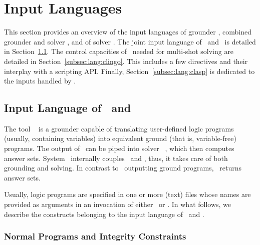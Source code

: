 \section{Input Languages}\label{sec:language}

This section provides an overview of the input languages of
grounder \gringo, combined grounder and solver \clingo, 
and of solver \clasp.
The joint input language of \gringo\ and \clingo\ is detailed in
Section~\ref{subsec:lang:gringo}.
The control capacities of \clingo\ needed for multi-shot solving are detailed in Section~\ref{subsec:lang:clingo}.
This includes a few directives and their interplay with a scripting API.
Finally, Section~\ref{subsec:lang:clasp} is dedicated to the inputs handled by \clasp.

\subsection{Input Language of \gringo\ and \clingo}\label{subsec:lang:gringo}

The tool \gringo~\cite{gescth07a} is a grounder capable of translating
user-defined logic programs (usually, containing variables) into 
equivalent ground (that is, variable-free) programs.
The output of \gringo\ can be piped into solver \clasp~\cite{gekanesc07a,gekasc09c},
which then computes answer sets.
System \clingo\ internally couples \gringo\ and \clasp, thus,
it takes care of both grounding and solving.
In contrast to \gringo\ outputting ground programs, 
\clingo\ returns answer sets.

Usually, logic programs are specified in one or more (text) files whose names are
provided as arguments
in an invocation of either \gringo\ or \clingo.
In what follows, we describe the 
constructs belonging to the input language of \gringo\ and \clingo.

\subsubsection{Normal Programs and Integrity Constraints}\label{subsec:gringo:normal}

